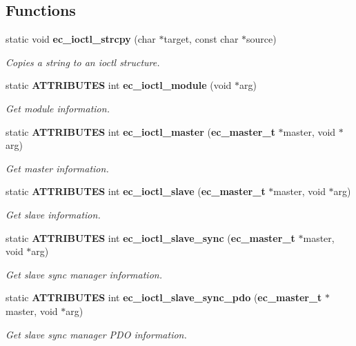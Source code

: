\subsection*{Functions}
\begin{DoxyCompactItemize}
\item 
static void {\bf ec\-\_\-ioctl\-\_\-strcpy} (char $\ast$target, const char $\ast$source)
\begin{DoxyCompactList}\small\item\em Copies a string to an ioctl structure. \end{DoxyCompactList}\item 
static {\bf A\-T\-T\-R\-I\-B\-U\-T\-E\-S} int {\bf ec\-\_\-ioctl\-\_\-module} (void $\ast$arg)
\begin{DoxyCompactList}\small\item\em Get module information. \end{DoxyCompactList}\item 
static {\bf A\-T\-T\-R\-I\-B\-U\-T\-E\-S} int {\bf ec\-\_\-ioctl\-\_\-master} ({\bf ec\-\_\-master\-\_\-t} $\ast$master, void $\ast$arg)
\begin{DoxyCompactList}\small\item\em Get master information. \end{DoxyCompactList}\item 
static {\bf A\-T\-T\-R\-I\-B\-U\-T\-E\-S} int {\bf ec\-\_\-ioctl\-\_\-slave} ({\bf ec\-\_\-master\-\_\-t} $\ast$master, void $\ast$arg)
\begin{DoxyCompactList}\small\item\em Get slave information. \end{DoxyCompactList}\item 
static {\bf A\-T\-T\-R\-I\-B\-U\-T\-E\-S} int {\bf ec\-\_\-ioctl\-\_\-slave\-\_\-sync} ({\bf ec\-\_\-master\-\_\-t} $\ast$master, void $\ast$arg)
\begin{DoxyCompactList}\small\item\em Get slave sync manager information. \end{DoxyCompactList}\item 
static {\bf A\-T\-T\-R\-I\-B\-U\-T\-E\-S} int {\bf ec\-\_\-ioctl\-\_\-slave\-\_\-sync\-\_\-pdo} ({\bf ec\-\_\-master\-\_\-t} $\ast$master, void $\ast$arg)
\begin{DoxyCompactList}\small\item\em Get slave sync manager P\-D\-O information. \end{DoxyCompactList}\item 

\end{DoxyCompactItemize}

